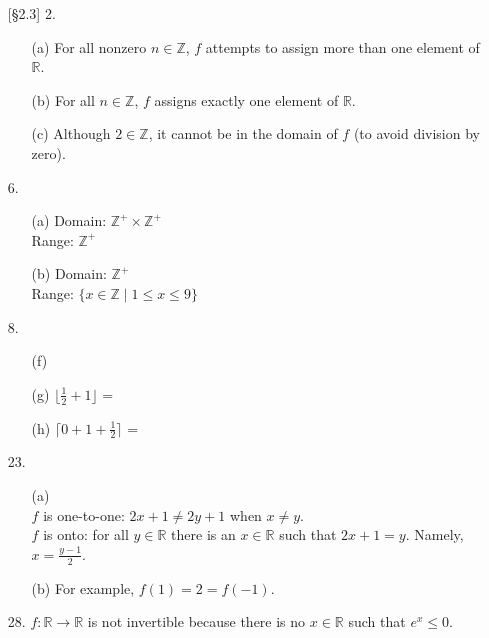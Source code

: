 \documentclass{article}
\begin{document}
\begin{enumerate}
    \item[{[\S 2.3]} 2.]
        \begin{itemize}
            \item[(a)]  For all nonzero $n \in \mathbb{Z}$, $f$ attempts to assign more than one element of $\mathbb{R}$.
            \item[(b)]  For all $n \in \mathbb{Z}$, $f$ assigns exactly one element of $\mathbb{R}$.
            \item[(c)]  Although $2 \in \mathbb{Z}$, it cannot be in the domain of $f$ (to avoid division by zero).
        \end{itemize}
    \item[6.]
        \begin{itemize}
            \item[(a)] Domain: $\mathbb{Z}^+ \times \mathbb{Z}^+$\\ Range: $\mathbb{Z}^+$
            \item[(b)] Domain: $\mathbb{Z}^+$\\ Range: $\{ x \in \mathbb{Z} \mid 1 \le x \le 9 \}$
        \end{itemize}
    \item[8.]
        \begin{itemize}
            \item[(f)] 
            \item[(g)] $\lfloor \frac{1}{2} + 1 \rfloor$ = 
            \item[(h)] $\lceil 0 + 1 + \frac{1}{2} \rceil$ = 
        \end{itemize}
    \item[23.]
        \begin{itemize}
            \item[(a)] \\
                        $f$ is one-to-one: $2x+1 \neq 2y+1$ when $x \neq y$.\\
                        $f$ is onto: for all $y \in \mathbb{R}$ there is an $x \in \mathbb{R}$ such that $2x+1=y$. Namely, $x = \frac{y-1}{2}$.
            \item[(b)]  For example, $f(1) = 2 = f(-1)$.
        \end{itemize}
    \item[28.] $f : \mathbb{R} \to \mathbb{R}$ is not invertible because there is no $x \in \mathbb{R}$ such that $e^x \le 0$.\\

\end{enumerate}
\end{document}
